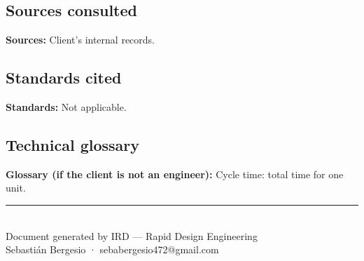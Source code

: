 \documentclass[11pt,a4paper]{article}
\newcommand{\campo}[2]{\noindent\textbf{\textcolor{irdblack}{#1:}} \textcolor{irdblack}{#2}\par\vspace{0.3em}}
\begin{document}
\subsection{Sources consulted}
\campo{Sources}{Client's internal records.}

\subsection{Standards cited}
\campo{Standards}{Not applicable.}

\subsection{Technical glossary}
\campo{Glossary (if the client is not an engineer)}{Cycle time: total time for one unit.}

\vfill

\begin{center}
{\color{irdorange}\rule{0.5\textwidth}{1pt}}\\[0.3cm]
{\small\color{irdblack} Document generated by IRD --- Rapid Design Engineering}\\
{\small\color{irdblack} Sebastián Bergesio · sebabergesio472@gmail.com}
\end{center}
\end{document}

